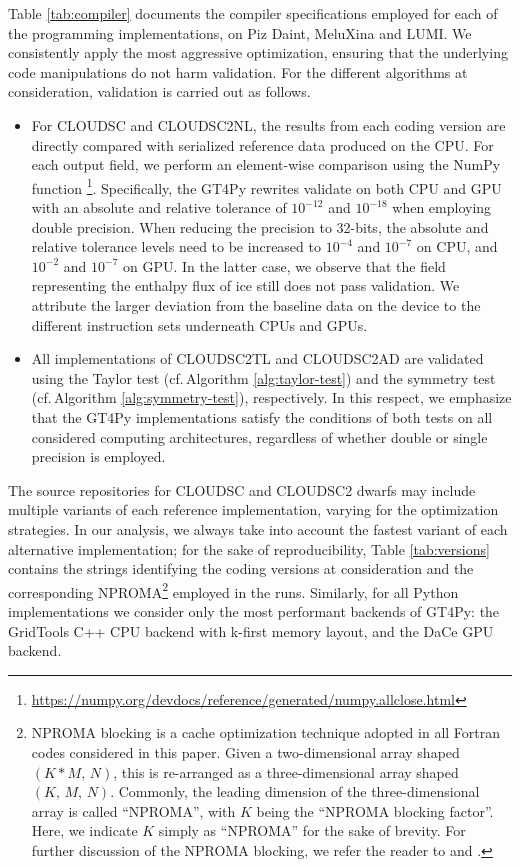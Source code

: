 \documentclass[main.tex]{subfiles}
\begin{document}
        \noindent Table \ref{tab:compiler} documents the compiler specifications employed for each of the programming implementations, on Piz Daint, MeluXina and LUMI. We consistently apply the most aggressive optimization, ensuring that the underlying code manipulations do not harm validation. For the different algorithms at consideration, validation is carried out as follows.
        \begin{itemize}
            \item For CLOUDSC and CLOUDSC2NL, the results from each coding version are directly compared with serialized reference data produced on the CPU. For each output field, we perform an element-wise comparison using the NumPy function \footnote{\url{https://numpy.org/devdocs/reference/generated/numpy.allclose.html}}. Specifically, the GT4Py rewrites validate on both CPU and GPU with an absolute and relative tolerance of $10^{-12}$ and $10^{-18}$ when employing double precision. When reducing the precision to 32-bits, the absolute and relative tolerance levels need to be increased to $10^{-4}$ and $10^{-7}$ on CPU, and $10^{-2}$ and $10^{-7}$ on GPU. In the latter case, we observe that the field representing the enthalpy flux of ice still does not pass validation. We attribute the larger deviation from the baseline data on the device to the different instruction sets underneath CPUs and GPUs.
            \item All implementations of CLOUDSC2TL and CLOUDSC2AD are validated using the Taylor test (cf.\,Algorithm \ref{alg:taylor-test}) and the symmetry test (cf.\,Algorithm \ref{alg:symmetry-test}), respectively. In this respect, we emphasize that the GT4Py implementations satisfy the conditions of both tests on all considered computing architectures, regardless of whether double or single precision is employed.
        \end{itemize}
        \noindent The source repositories for CLOUDSC and CLOUDSC2 dwarfs may include multiple variants of each reference implementation, varying for the optimization strategies. In our analysis, we always take into account the fastest variant of each alternative implementation; for the sake of reproducibility, Table \ref{tab:versions} contains the strings identifying the coding versions at consideration and the corresponding NPROMA\footnote{NPROMA blocking is a cache optimization technique adopted in all Fortran codes considered in this paper. Given a two-dimensional array shaped $(K * M, \, N)$, this is re-arranged as a three-dimensional array shaped $(K, \, M, \, N)$. Commonly, the leading dimension of the three-dimensional array is called ``NPROMA'', with $K$ being the ``NPROMA blocking factor''. Here, we indicate $K$ simply as ``NPROMA'' for the sake of brevity. For further discussion of the NPROMA blocking, we refer the reader to \citet{muller19} and \citet{bauer20}.} employed in the runs. Similarly, for all Python implementations we consider only the most performant backends of GT4Py: the GridTools C++ CPU backend with k-first memory layout, and the DaCe GPU backend.
\end{document}
